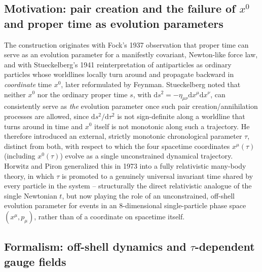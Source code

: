 \documentclass[11pt]{article}
\newcommand{\dd}{\mathrm{d}}
\begin{document}
\subsection{Motivation: pair creation and the failure of $x^0$ and proper time as evolution parameters}

The construction originates with Fock's 1937 observation that proper time can serve as an evolution parameter for a manifestly covariant, Newton-like force law, and with Stueckelberg's 1941 reinterpretation of antiparticles as ordinary particles whose worldlines locally turn around and propagate backward in \emph{coordinate} time $x^0$, later reformulated by Feynman. Stueckelberg noted that neither $x^0$ nor the ordinary proper time $s$, with $\dd s^2 = -\eta_{\mu\nu}\dd x^\mu\dd x^\nu$, can consistently serve as \emph{the} evolution parameter once such pair creation/annihilation processes are allowed, since $\dd s^2/\dd\tau^2$ is not sign-definite along a worldline that turns around in time and $x^0$ itself is not monotonic along such a trajectory. He therefore introduced an external, strictly monotonic chronological parameter $\tau$, distinct from both, with respect to which the four spacetime coordinates $x^\mu(\tau)$ (including $x^0(\tau)$) evolve as a single unconstrained dynamical trajectory. Horwitz and Piron generalized this in 1973 into a fully relativistic many-body theory, in which $\tau$ is promoted to a genuinely universal invariant time shared by every particle in the system -- structurally the direct relativistic analogue of the single Newtonian $t$, but now playing the role of an unconstrained, off-shell evolution parameter for events in an 8-dimensional single-particle phase space $(x^\mu,p_\mu)$, rather than of a coordinate on spacetime itself.

\subsection{Formalism: off-shell dynamics and $\tau$-dependent gauge fields}
\end{document}

